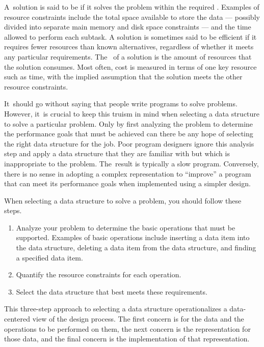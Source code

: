 A~solution is said to be
if it solves the problem within the required
.
Examples of resource constraints include the total space available to
store the data --- possibly divided into separate main memory and disk
space constraints --- and the time allowed to perform each subtask.
A solution is sometimes said to be
efficient if it requires fewer resources than known alternatives,
regardless of whether it meets any particular requirements.
The~ of a solution is the
amount of resources that the solution consumes.
Most often, cost is measured in terms of one key resource such as
time, with the implied assumption that the solution meets the other
resource constraints.

It~should go without saying that people write programs to
solve problems.
However, it~is crucial to keep this truism in mind when selecting a
data structure to solve a particular problem.
Only by first analyzing the problem to determine the performance
goals that must be achieved can there be any hope of selecting the
right data structure for the job.
Poor program designers ignore this analysis step
and apply a data structure that they are familiar with but which is
inappropriate to the problem.
The~result is typically a slow program.
Conversely, there is no sense in adopting a complex representation to
``improve'' a program that can meet its performance goals when
implemented using a simpler design.

When selecting a data structure to solve a problem, you should follow
these steps.

\begin{enumerate}

\item
Analyze your problem to determine the basic
operations that must be supported.
Examples of basic operations include inserting a data
item into the data structure, deleting a data item from the
data structure, and finding a specified data item.

\item
Quantify the resource constraints for each operation.

\item
Select the data structure that best meets these requirements.

\end{enumerate}

This three-step approach to selecting a data structure operationalizes
a data-centered view of the design process.
The first concern is for the data and the operations to be performed
on them, the next concern is the representation for those data, and
the final concern is the implementation of that representation.

